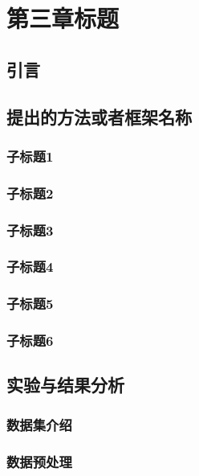 \chapter{第三章标题}

\section{引言}

\section{提出的方法或者框架名称}

\subsection{子标题1}

\subsection{子标题2}

\subsection{子标题3}

\subsection{子标题4}

\subsection{子标题5}

\subsection{子标题6}

\section{实验与结果分析}

\subsection{数据集介绍}

\subsection{数据预处理}

